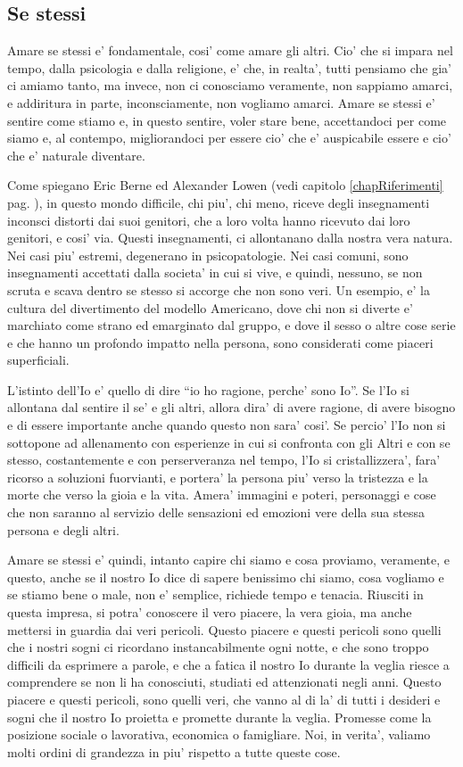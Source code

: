 \subsection{Se stessi}
Amare se stessi e' fondamentale, cosi' come amare gli altri. Cio' che si impara nel tempo, dalla psicologia e dalla religione, e' che, in realta', tutti pensiamo che gia' ci amiamo tanto, ma invece, non ci conosciamo veramente, non sappiamo amarci, e addiritura in parte, inconsciamente, non vogliamo amarci. 
Amare se stessi e' sentire come stiamo e, in questo sentire, voler stare bene, accettandoci per come siamo e, al contempo, migliorandoci per essere cio' che e' auspicabile essere e cio' che e' naturale diventare.

Come spiegano Eric Berne ed Alexander Lowen (vedi capitolo \ref{chapRiferimenti} pag. \pageref{chapRiferimenti}), in questo mondo difficile, chi piu', chi meno, riceve degli insegnamenti inconsci distorti dai suoi genitori, che a loro volta hanno ricevuto dai loro genitori, e cosi' via. Questi insegnamenti, ci allontanano dalla nostra vera natura. Nei casi piu' estremi, degenerano in psicopatologie. Nei casi comuni, sono insegnamenti accettati dalla societa' in cui si vive, e quindi, nessuno, se non scruta e scava dentro se stesso si accorge che non sono veri. Un esempio, e' la cultura del divertimento del modello Americano, dove chi non si diverte e' marchiato come strano ed emarginato dal gruppo, e dove il sesso o altre cose serie e che hanno un profondo impatto nella persona, sono considerati come piaceri superficiali.

L'istinto dell'Io e' quello di dire ``io ho ragione, perche' sono Io''. Se l'Io si allontana dal sentire il se' e gli altri, allora dira' di avere ragione, di avere bisogno e di essere importante anche quando questo non sara' cosi'. Se percio' l'Io non si sottopone ad allenamento con esperienze in cui si confronta con gli Altri e con se stesso, costantemente e con perserveranza nel tempo, l'Io si cristallizzera', fara' ricorso a soluzioni fuorvianti, e portera' la persona piu' verso la tristezza e la morte che verso la gioia e la vita. Amera' immagini e poteri, personaggi e cose che non saranno al servizio delle sensazioni ed emozioni vere della sua stessa persona e degli altri.

Amare se stessi e' quindi, intanto capire chi siamo e cosa proviamo, veramente, e questo, anche se il nostro Io dice di sapere benissimo chi siamo, cosa vogliamo e se stiamo bene o male, non e' semplice, richiede tempo e tenacia. Riusciti in questa impresa, si potra' conoscere il vero piacere, la vera gioia, ma anche mettersi in guardia dai veri pericoli. Questo piacere e questi pericoli sono quelli che i nostri sogni ci ricordano instancabilmente ogni notte, e che sono troppo difficili da esprimere a parole, e che a fatica il nostro Io durante la veglia riesce a comprendere se non li ha conosciuti, studiati ed attenzionati negli anni. Questo piacere e questi pericoli, sono quelli veri, che vanno al di la' di tutti i desideri e sogni che il nostro Io proietta e promette durante la veglia. Promesse come la posizione sociale o lavorativa, economica o famigliare. Noi, in verita', valiamo molti ordini di grandezza in piu' rispetto a tutte queste cose.

